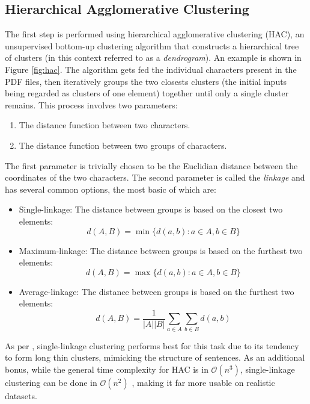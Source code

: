 \subsection{Hierarchical Agglomerative Clustering}
The first step is performed using hierarchical agglomerative clustering (HAC),
an unsupervised bottom-up clustering algorithm that constructs a hierarchical
tree of clusters (in this context referred to as a \emph{dendrogram}). An
example is shown in Figure \ref{fig:hac}. The algorithm gets fed the individual
characters present in the PDF files, then iteratively groups the two closests
clusters (the initial inputs being regarded as clusters of one element) together
until only a single cluster remains. This process involves two parameters:
\begin{enumerate}
\item The distance function between two characters.
\item The distance function between two groups of characters.
\end{enumerate}
The first parameter is trivially chosen to be the Euclidian distance between the
coordinates of the two characters. The second parameter is called the
\emph{linkage} and has several common options, the most basic of which are:
\begin{itemize}
\item Single-linkage: The distance between groups is based on the closest two
  elements: \[ d(A, B) = \min \{ d(a, b) : a \in A, b \in B \} \]
\item Maximum-linkage: The distance between groups is based on the furthest two
  elements: \[ d(A, B) = \max \{ d(a, b) : a \in A, b \in B \} \]
\item Average-linkage: The distance between groups is based on the furthest two
  elements: \[ d(A, B) = \frac{1}{|A||B|} \sum_{a \in A}\sum_{b \in B} d(a, b) \]
\end{itemize}
As per \textcite{klampfl2014unsupervised}, single-linkage clustering performs
best for this task due to its tendency to form long thin clusters, mimicking the
structure of sentences. As an additional bonus, while the general time
complexity for HAC is in $\mathcal{O}(n^3)$, single-linkage clustering can be
done in $\mathcal{O}(n^2)$ \citep{sibson1973slink}, making it far more usable on
realistic datasets.

